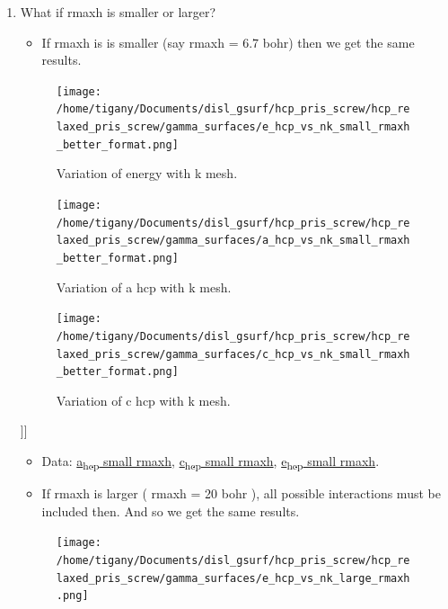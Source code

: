 \documentclass[11pt]{article}
\begin{document}
\begin{enumerate}
\begin{enumerate}
\item What if rmaxh is smaller or larger?
\label{sec:org0fafb30}
\begin{itemize}
\item If rmaxh is is smaller (say rmaxh = 6.7 bohr) then we get the same
results.
\end{itemize}
\begin{figure}[htbp]
\centering
\texttt{[image: /home/tigany/Documents/disl\_gsurf/hcp\_pris\_screw/hcp\_relaxed\_pris\_screw/gamma\_surfaces/e\_hcp\_vs\_nk\_small\_rmaxh\_better\_format.png]}
\caption{\label{fig:orgaf41d69}
Variation of energy with k mesh.}
\end{figure}
\begin{figure}[htbp]
\centering
\texttt{[image: /home/tigany/Documents/disl\_gsurf/hcp\_pris\_screw/hcp\_relaxed\_pris\_screw/gamma\_surfaces/a\_hcp\_vs\_nk\_small\_rmaxh\_better\_format.png]}
\caption{\label{fig:org8c2dd2a}
Variation of a hcp with k mesh.}
\end{figure}
\begin{figure}[htbp]
\centering
\texttt{[image: /home/tigany/Documents/disl\_gsurf/hcp\_pris\_screw/hcp\_relaxed\_pris\_screw/gamma\_surfaces/c\_hcp\_vs\_nk\_small\_rmaxh\_better\_format.png]}
\caption{\label{fig:org3a41bbf}
Variation of c hcp with k mesh.}
\end{figure}]]
\begin{itemize}
\item Data: \href{file:///home/tigany/Documents/disl\_gsurf/hcp\_pris\_screw/hcp\_relaxed\_pris\_screw/gamma\_surfaces/a\_hcp\_vs\_nk\_rmaxh\_small.pkl}{a\textsubscript{hcp} small rmaxh}, \href{file:///home/tigany/Documents/disl\_gsurf/hcp\_pris\_screw/hcp\_relaxed\_pris\_screw/gamma\_surfaces/c\_hcp\_vs\_nk\_rmaxh\_small.pkl}{c\textsubscript{hcp} small rmaxh}, \href{file:///home/tigany/Documents/disl\_gsurf/hcp\_pris\_screw/hcp\_relaxed\_pris\_screw/gamma\_surfaces/e\_hcp\_vs\_nk\_rmaxh\_small.pkl}{e\textsubscript{hcp} small rmaxh}.
\end{itemize}
\begin{itemize}
\item If rmaxh is larger ( rmaxh = 20 bohr ), all possible interactions must
be included then. And so we get the same results.
\end{itemize}
\begin{figure}[htbp]
\centering
\texttt{[image: /home/tigany/Documents/disl\_gsurf/hcp\_pris\_screw/hcp\_relaxed\_pris\_screw/gamma\_surfaces/e\_hcp\_vs\_nk\_large\_rmaxh.png]}

\end{figure}
\end{enumerate}
\end{enumerate}
\end{document}
